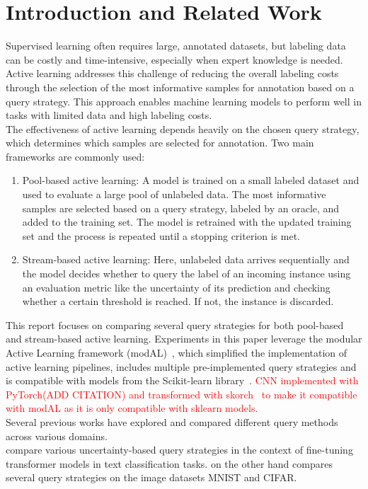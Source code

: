 \documentclass{article}
\theoremstyle{plain}
\theoremstyle{definition}
\theoremstyle{remark}
\begin{document}
\section{Introduction and Related Work}\label{sec:intro}
Supervised learning often requires large, annotated datasets, but labeling data can be costly and time-intensive, especially when expert knowledge is needed. 
Active learning addresses this challenge of reducing the overall labeling costs through the selection of the most informative samples for annotation based on a query strategy. This approach enables machine learning models to perform well in tasks with limited data and high labeling costs. \\
The effectiveness of active learning depends heavily on the chosen query strategy, which determines which samples are selected for annotation. Two main frameworks are commonly used:
\begin{enumerate}
	\item Pool-based active learning: A model is trained on a small labeled dataset and used to evaluate a large pool of unlabeled data. The most informative samples are selected based on a query strategy, labeled by an oracle, and added to the training set. The model is retrained with the updated training set and the process is repeated until a stopping criterion is met.
	\item Stream-based active learning: Here, unlabeled data arrives sequentially and the model decides whether to query the label of an incoming instance using an evaluation metric like the uncertainty of its prediction and checking whether a certain threshold is reached. If not, the instance is discarded.
\end{enumerate}
This report focuses on comparing several query strategies for both pool-based and stream-based active learning. Experiments in this paper leverage the modular Active Learning framework (modAL)~\cite{danka_modalmodularactivelearning}, which simplified the implementation of active learning pipelines, includes multiple pre-implemented query strategies and is compatible with models from the Scikit-learn library~\cite{scikit-learn}. \textcolor{red}{CNN implemented with PyTorch(ADD CITATION) and transformed with skorch~\cite{skorch} to make it compatible with modAL as it is only compatible with sklearn models.} \\
Several previous works have explored and compared different query methods across various domains. \\
\cite{schröder_revisitinguncertaintybasedquerystrategies} compare various uncertainty-based query strategies in the context of fine-tuning transformer models in text classification tasks. \cite{zhan_comparativesurveydeepactive} on the other hand compares several query strategies on the image datasets MNIST and CIFAR. \\
\end{document}
